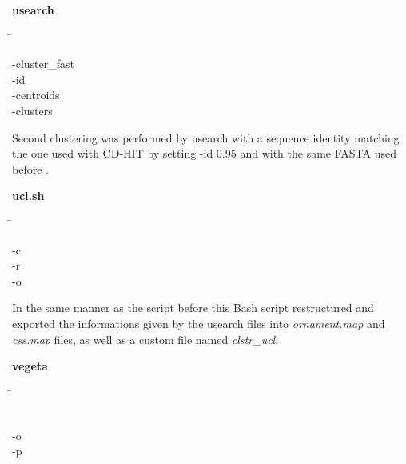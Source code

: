     \begin{leftbar}
        \textbf{usearch}
        \begin{nstabbing}
            \qquad\qquad\qquad \= \kill
        
            -{}cluster\_fast \\
        
            -{}id \\
            
            -{}centroids \\
            
            -{}clusters 
        \end{nstabbing}
    \end{leftbar}
    
    Second clustering was performed by usearch with a sequence identity matching the one used with CD-HIT by setting \colorbox{backcolour}{-id 0.95} and with the same FASTA used before \autocite{Usearch}.
    
    \begin{leftbar}
        \textbf{ucl.sh}
        \begin{nstabbing}
            \qquad \= \kill
        
            -c \\
        
            -r \\
            
            -o 
        \end{nstabbing}
    \end{leftbar}
    
    In the same manner as the script before this Bash script restructured and exported the informations given by the usearch files into \textit{ornament.map} and \textit{css.map} files, as well as a custom file named \textit{clstr\_ucl}.
    
    \begin{leftbar}
        \textbf{vegeta}
        \begin{nstabbing}
            \qquad \= \kill
            
            \\
            
            -o \\
            
            -p 
        \end{nstabbing}
    \end{leftbar}
    
